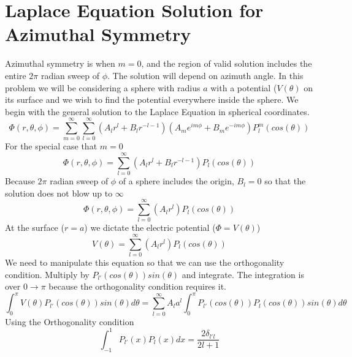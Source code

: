 \documentclass[12pt]{article}
\begin{document}
\section{Laplace Equation Solution for Azimuthal Symmetry} \label{problem3}
    Azimuthal symmetry is when $m=0$, and the region of valid solution includes the entire $2\pi$ radian sweep of $\phi$. The solution will depend on azimuth angle.
    \newline In this problem we will be considering a sphere with radius $a$ with a potential ($V(\theta)$ on its surface and we wish to find the potential everywhere inside the sphere. 
    \newline We begin with the general solution to the Laplace Equation in spherical coordinates.
    \begin{equation} \label{eq: 4.1}
        \Phi(r,\theta, \phi) = \sum_{m=0}^{\infty}  \sum_{l=0}^{\infty} (A_l r^l + B_l r^{-l-1}) (A_m  e^{i m \phi} + B_m e^{-i m \phi}) P_l^m (cos(\theta))
    \end{equation}
    For the special case that $m=0$
    \begin{equation} \label{eq: 4.2}
        \Phi(r,\theta, \phi) = \sum_{l=0}^{\infty} (A_l r^l + B_l r^{-l-1}) P_l (cos(\theta))
    \end{equation}
    Because $2\pi$ radian sweep of $\phi$ of a sphere includes the origin, $B_l = 0$ so that the solution does not blow up to $\infty$
    \begin{equation} \label{eq: 4.3}
        \Phi(r,\theta, \phi) = \sum_{l=0}^{\infty} (A_l r^l) P_l (cos(\theta))
    \end{equation}
    At the surface ($r=a$) we dictate the electric potential ($\Phi = V(\theta)$)
    \begin{equation} \label{eq: 4.4}
        V(\theta) = \sum_{l=0}^{\infty} (A_l r^l) P_l (cos(\theta))
    \end{equation}
    We need to manipulate this equation so that we can use the orthogonality condition. Multiply by $P_{l'}(cos(\theta)) sin(\theta)$ and integrate. The integration is over $0 \xrightarrow{} \pi$ because the orthogonality condition requires it. 
    \begin{equation} \label{eq: 4.5}
        \int_0^{\pi} V(\theta) P_{l'}(cos(\theta)) sin(\theta) d\theta = \sum_{l=0}^\infty A_l a^l \int_0^{\pi} P_{l'}(cos(\theta)) P_l(cos(\theta)) sin(\theta) d\theta
    \end{equation}
    Using the Orthogonality condition
    \begin{equation} \label{eq: 4.6}
        \int_{-1}^{1} P_{l'}(x) P_l(x) dx = \frac{2 \delta_{l'l}}{2l + 1}
    \end{equation}
\end{document}
